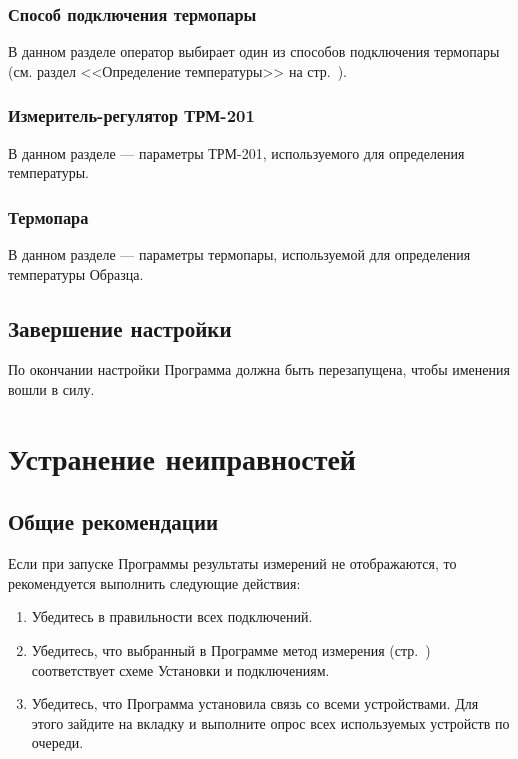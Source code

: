 \documentclass[12pt, a4paper, twocolumn]{report}
\begin{document}
\subsection{Способ подключения термопары}

В данном разделе оператор выбирает один из способов подключения термопары (см. раздел <<Определение температуры>> на стр.~\pageref{sec_t_measures}).

\subsection{Измеритель-регулятор ТРМ-201}

В данном разделе --- параметры ТРМ-201, используемого для определения температуры.



\subsection{Термопара}

В данном разделе --- параметры термопары, используемой для определения температуры Образца.



\section{Завершение настройки}

По окончании настройки Программа должна быть перезапущена, чтобы именения вошли в силу.

\chapter{Устранение неиправностей}

\section{Общие рекомендации}

Если при запуске Программы результаты измерений не отображаются, то рекомендуется выполнить следующие действия:

\begin{enumerate}
\item Убедитесь в правильности всех подключений.
\item Убедитесь, что выбранный в Программе метод измерения (стр.~\pageref{sec_r_measure_config}) соответствует схеме Установки и подключениям.
\item Убедитесь, что Программа установила связь со всеми устройствами. Для этого зайдите на вкладку  и выполните опрос всех используемых устройств по очереди.
\end{enumerate}
\end{document}

